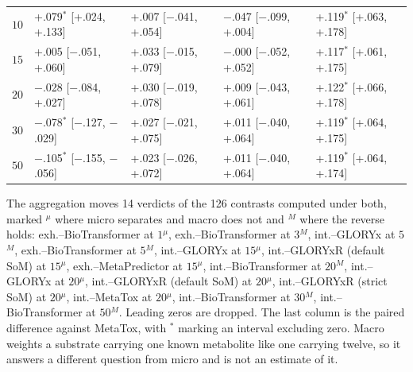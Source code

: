 \begin{table}[h]
\begin{threeparttable}
\begin{tabular}{rllll}
$10$ & +.079$^{*}$ [+.024, +.133] & +.007\phantom{$^{*}$} [$-$.041, +.054] & $-$.047\phantom{$^{*}$} [$-$.099, +.004] & +.119$^{*}$ [+.063, +.178] \\
$15$ & +.005\phantom{$^{*}$} [$-$.051, +.060] & +.033\phantom{$^{*}$} [$-$.015, +.079] & $-$.000\phantom{$^{*}$} [$-$.052, +.052] & +.117$^{*}$ [+.061, +.175] \\
$20$ & $-$.028\phantom{$^{*}$} [$-$.084, +.027] & +.030\phantom{$^{*}$} [$-$.019, +.078] & +.009\phantom{$^{*}$} [$-$.043, +.061] & +.122$^{*}$ [+.066, +.178] \\
$30$ & $-$.078$^{*}$ [$-$.127, $-$.029] & +.027\phantom{$^{*}$} [$-$.021, +.075] & +.011\phantom{$^{*}$} [$-$.040, +.064] & +.119$^{*}$ [+.064, +.175] \\
$50$ & $-$.105$^{*}$ [$-$.155, $-$.056] & +.023\phantom{$^{*}$} [$-$.026, +.072] & +.011\phantom{$^{*}$} [$-$.040, +.064] & +.119$^{*}$ [+.064, +.174] \\
\bottomrule
\end{tabular}
\begin{tablenotes}[flushleft]\footnotesize
\item The aggregation moves 14 verdicts of the 126 contrasts computed under both, marked $^{\mu}$ where micro separates and macro does not and $^{M}$ where the reverse holds: exh.--BioTransformer at $1$$^{\mu}$, exh.--BioTransformer at $3$$^{M}$, int.--GLORYx at $5$$^{M}$, exh.--BioTransformer at $5$$^{M}$, int.--GLORYx at $15$$^{\mu}$, int.--GLORYxR (default SoM) at $15$$^{\mu}$, exh.--MetaPredictor at $15$$^{\mu}$, int.--BioTransformer at $20$$^{M}$, int.--GLORYx at $20$$^{\mu}$, int.--GLORYxR (default SoM) at $20$$^{\mu}$, int.--GLORYxR (strict SoM) at $20$$^{\mu}$, int.--MetaTox at $20$$^{\mu}$, int.--BioTransformer at $30$$^{M}$, int.--BioTransformer at $50$$^{M}$. Leading zeros are dropped. The last column is the paired difference against MetaTox, with $^{*}$ marking an interval excluding zero. Macro weights a substrate carrying one known metabolite like one carrying twelve, so it answers a different question from micro and is not an estimate of it.
\end{tablenotes}
\end{threeparttable}
\end{table}
